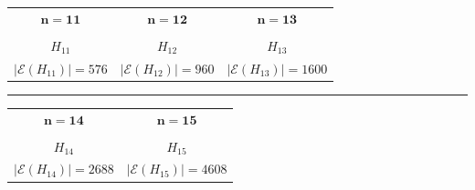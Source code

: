 \documentclass{article}
\newcommand{\Heleven}{
\begin{tikzpicture}[scale=0.8]
\begin{scope}[rotate=90]
    \node[cvertex] (10) at (0, 0) {};

    \node[cvertex] (1) at (-0.8, 1.0) {};
    \node[cvertex] (2) at (-0.8, -1.0) {};
    \node[cvertex]      (7) at (-1.4, 1.8) {};
    \node[cvertex]      (9) at (-1.4, -1.8) {};
    \node[cvertex]       (5) at (-2.2, 0) {};

    \node[cvertex] (3) at (0.8, 1.0) {};
    \node[cvertex] (4) at (0.8, -1.0) {};
    \node[cvertex]       (6)  at (1.4, 1.8) {};
    \node[cvertex]       (8)  at (1.4, -1.8) {};
    \node[cvertex]    (11) at (2.2, 0) {};

    \draw[thick]
        (1)--(5) (1)--(7) (1)--(9) 
        (2)--(5) (2)--(7) (2)--(9)
        (5)--(7) (5)--(9) 
        (7)--(9)
        
        (3)--(6) (3)--(8) (3)--(11)
        (4)--(6) (4)--(8) (4)--(11)
        (6)--(8) (6)--(11) 
        (8)--(11)
        
        (10)--(1) (10)--(2)
        
        (10)--(3) (10)--(4);
        \end{scope}
\end{tikzpicture}
}
\newcommand{\Htwelve}{
\begin{tikzpicture}[scale=0.8]
    \begin{scope}[rotate=90]
        \node[cvertex] (6) at (0, 0) {};
    
        \node[cvertex]   (9)  at (-0.8, 1.0) {};
        \node[cvertex](10) at (-0.8, -1.0) {};
        
        \node[cvertex] (1) at (-1.6, 1.8) {};
        \node[cvertex]  (7) at (-2.2, 0) {};
        \node[cvertex] (4) at (-1.6, -1.8) {};
    
        \node[cvertex]   (3)  at (0.8, 1.0) {};
        \node[cvertex](11) at (0.8, -1.0) {};
        
        \node[cvertex]    (8)  at (1.4, 1.8) {};
        \node[cvertex] (12) at (2.2, 0.8) {};
        \node[cvertex]    (5)  at (2.2, -0.8) {};
        \node[cvertex]    (2)  at (1.4, -1.8) {};
    
        \draw[thick]
            (1)--(4) (1)--(7) (1)--(9) (1)--(10)
            (4)--(7) (4)--(9) (4)--(10)
            (7)--(9) (7)--(10)
            
            (3)--(8) (3)--(11) (3)--(12)
            (11)--(2) (11)--(5)
            (8)--(12) (8)--(5) (8)--(2)
            (12)--(5) (12)--(2)
            (5)--(2)
            
            (6)--(9) (6)--(10)
            
            (6)--(3) (6)--(11);
        \end{scope}
\end{tikzpicture}
}
\newcommand{\Hthirteen}{
\begin{tikzpicture}[scale=0.8]
    \begin{scope}[rotate=90]
    \node[cvertex] (7) at (0, 0) {};

    \node[cvertex] (11) at (-0.8, 1.0) {};
    \node[cvertex]    (3)  at (-0.8, -1.0) {};
    
    \node[cvertex]    (1)  at (-1.4, 1.8) {};
    \node[cvertex]     (5)  at (-2.2, 0.8) {};
    \node[cvertex]     (8)  at (-2.2, -0.8) {};
    \node[cvertex] (10) at (-1.4, -1.8) {};

    \node[cvertex] (12) at (0.8, 1.0) {};
    \node[cvertex]    (4)  at (0.8, -1.0) {};
    
    \node[cvertex]    (2)  at (1.4, 1.8) {};
    \node[cvertex]    (6)  at (2.2, 0.8) {};
    \node[cvertex] (13) at (2.2, -0.8) {};
    \node[cvertex]    (9)  at (1.4, -1.8) {};

    \draw[thick]
        (11)--(1) (11)--(5) 
        (3)--(8) (3)--(10)
        (11)--(3) %
        (1)--(5) (1)--(8) (1)--(10)
        (5)--(8) (5)--(10)
        (8)--(10)
        
        (12)--(2) (12)--(6)
        (4)--(9) (4)--(13)
        (12)--(4) %
        (2)--(6) (2)--(9) (2)--(13)
        (6)--(9) (6)--(13)
        (9)--(13)
        
        (7)--(11) (7)--(3)
        
        (7)--(12) (7)--(4);
    \end{scope}
\end{tikzpicture}
}
\newcommand{\Hfourteen}{
\begin{tikzpicture}[scale=0.8]
    \begin{scope}[rotate=90]
            \node[cvertex] (12) at (0, 0) {};
        
            \node[cvertex] (3) at (-0.8, 1.0) {};
            \node[cvertex] (4) at (-0.8, -1.0) {};
            \node[cvertex]      (8) at (-1.4, 1.8) {};
            \node[cvertex]      (9) at (-1.4, -1.8) {};
            \node[cvertex]    (11) at (-2.2, 0) {};
        
            \node[cvertex] (2) at (0.8, 1.0) {};
            \node[cvertex] (6) at (0.8, -1.0) {};
            \node[cvertex]    (10) at (1.4, 1.5) {};
            \node[cvertex]    (13) at (1.4, -1.5) {};
            \node[cvertex]       (1) at (2.5, 1.8) {};
            \node[cvertex]    (14) at (1.6, 0.6) {};
            \node[cvertex]       (5) at (1.6, -0.6) {};
            \node[cvertex]       (7) at (2.5, -1.8) {};
        
            \draw[thick]
                (3)--(8) (3)--(9) (3)--(11)
                (4)--(8) (4)--(9) (4)--(11)
                (8)--(9) (8)--(11) (9)--(11)
                
                (2)--(6) (2)--(10) (2)--(13)
                (6)--(10) (6)--(13)
                (10)--(1) (10)--(14)
                (13)--(5) (13)--(7)
                (1)--(14) (1)--(5) (1)--(7)
                (14)--(5) (14)--(7)
                (5)--(7)
                
                (12)--(3) (12)--(4)
                (12)--(2) (12)--(6);
        \end{scope}
    \end{tikzpicture}
}
\newcommand{\Hfifteen}{
\begin{tikzpicture}[scale=0.8]
    \begin{scope}[rotate=90]
            \node[cvertex] (14) at (0, 0) {};
        
            \node[cvertex] (3)  at (0.8, 1.0) {};
            \node[cvertex] (4)  at (0.8, -1.0) {};
            \node[cvertex]    (11) at (1.4, 1.8) {};
            \node[cvertex]       (9)  at (1.4, -1.8) {};
            \node[cvertex]    (15) at (2.2, 0) {};
        
            \node[cvertex]  (6)  at (-0.5, 1.0) {};
            \node[cvertex]  (8)  at (-0.5, -1.0) {};
            \node[cvertex]       (2)  at (-1.2, 1.5) {};
            \node[cvertex]    (13) at (-1.2, -1.5) {};
            \node[cvertex]    (12) at (-1.8, 1.5) {};
            \node[cvertex]    (10) at (-1.8, -1.5) {};
            \node[cvertex]       (5)  at (-2.4, 1.8) {};
            \node[cvertex]       (7)  at (-2.4, -1.8) {};
            \node[cvertex]        (1)  at (-3.0, 0) {};
        
            \draw[thick]
                (3)--(9) (3)--(11) (3)--(15)
                (4)--(9) (4)--(11) (4)--(15)
                (9)--(11) (9)--(15) (11)--(15)
                
                (6)--(8) (6)--(2) (6)--(13)
                (8)--(2) (8)--(13)
                (2)--(13)
                (2)--(12) (13)--(10) %
                (12)--(1) (12)--(5) (12)--(7)
                (10)--(1) (10)--(5) (10)--(7)
                (1)--(5) (1)--(7) (5)--(7)
                
                (14)--(3) (14)--(4)
                (14)--(6) (14)--(8);
        \end{scope}
    \end{tikzpicture}
}
\begin{document}
        \begin{center}
            \begin{tabular}{ccc}
                $\bm{n=11}$  \hspace{2.5mm} & \hspace{2.5mm} $\bm{n=12}$ & \hspace{2.5mm} $\bm{n=13}$ \vspace{2mm}\\
                \Heleven    \hspace{2.5mm} &  \hspace{2.5mm} \Htwelve &  \hspace{2.5mm} \Hthirteen  \\
                $H_{11}$  \hspace{2.5mm} & \hspace{2.5mm} $H_{12}$ &  \hspace{2.5mm} $H_{13}$ \vspace{1.5mm} \\
                $|\mathcal{E}(H_{11})| =576 $  \hspace{2.5mm} & \hspace{2.5mm} $|\mathcal{E}(H_{12})| =960$ & \hspace{2.5mm} $|\mathcal{E}(H_{13})| =1600 $ \vspace{1.5mm}\\
            \end{tabular}
            \noindent\rule{\textwidth}{0.4pt}
            \bigskip

            \begin{tabular}{cc}
                $\bm{n=14}$  \hspace{5mm} & \hspace{5mm} $\bm{n=15}$ \vspace{2mm}\\
                \Hfourteen    \hspace{5mm} &  \hspace{5mm} \Hfifteen  \\
                $H_{14}$  \hspace{5mm} & \hspace{5mm} $H_{15}$ \vspace{1.5mm}\\
                $|\mathcal{E}(H_{14})| =2688 $  \hspace{5mm} & \hspace{5mm} $|\mathcal{E}(H_{15})| =4608 $ \vspace{1.5mm}\\
            \end{tabular}

            
        \end{center}
\end{document}
